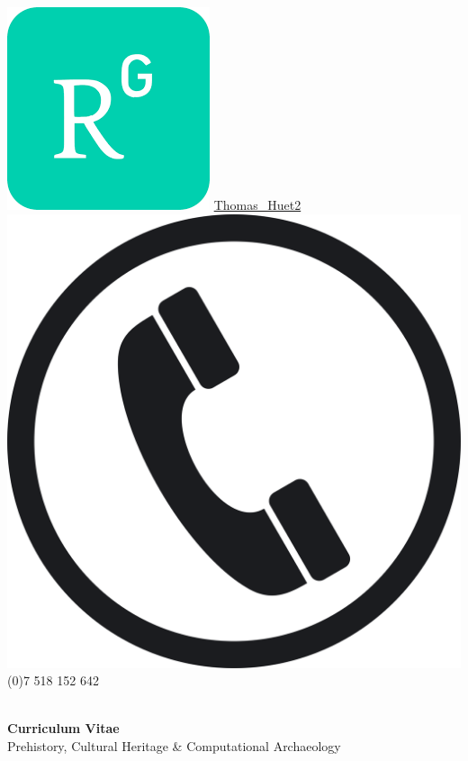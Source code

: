 \documentclass{article}
\begin{document}
\includegraphics[scale=0.05]{rgate} \quad \href{https://www.researchgate.net/profile/Thomas\_Huet2}{Thomas\_Huet2} \\
\includegraphics[scale=0.005]{phone} \quad  {} (0)7 518 152 642 \\

\\

\begin{adjustwidth}{50pt}{50pt}
\begin{center}
\large{\textbf{Curriculum Vitae}}\\
\large{Prehistory, Cultural Heritage \& Computational Archaeology} 
\end{center}
\end{adjustwidth}
\end{document}
